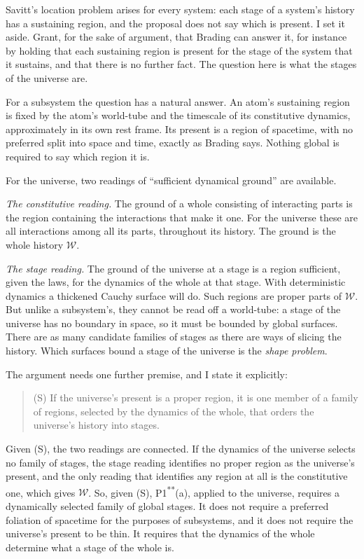 \documentclass[11pt]{article}
\newcommand{\W}{\mathcal W}
\begin{document}
Savitt's location problem arises for every system: each stage of a system's
history has a sustaining region, and the proposal does not say which is
present. I set it aside. Grant, for the sake of argument, that Brading can
answer it, for instance by holding that each sustaining region is present for
the stage of the system that it sustains, and that there is no further fact.
The question here is what the stages of the universe are.

For a subsystem the question has a natural answer. An atom's sustaining
region is fixed by the atom's world-tube and the timescale of its constitutive
dynamics, approximately in its own rest frame. Its present is a region of
spacetime, with no preferred split into space and time, exactly as Brading
says. Nothing global is required to say which region it is.

For the universe, two readings of ``sufficient dynamical ground'' are
available.

\emph{The constitutive reading.} The ground of a whole consisting of
interacting parts is the region containing the interactions that make it one.
For the universe these are all interactions among all its parts, throughout
its history. The ground is the whole history $\W$.

\emph{The stage reading.} The ground of the universe at a stage is a region
sufficient, given the laws, for the dynamics of the whole at that stage. With
deterministic dynamics a thickened Cauchy surface will do. Such regions are
proper parts of $\W$. But unlike a subsystem's, they cannot be read off a
world-tube: a stage of the universe has no boundary in space, so it must be
bounded by global surfaces. There are as many candidate families of stages as
there are ways of slicing the history. Which surfaces bound a stage of the
universe is the \emph{shape problem}.

The argument needs one further premise, and I state it explicitly:

\begin{quote}
(S) If the universe's present is a proper region, it is one member of a
family of regions, selected by the dynamics of the whole, that orders the
universe's history into stages.
\end{quote}

Given (S), the two readings are connected. If the dynamics of the universe
selects no family of stages, the stage reading identifies no proper region as
the universe's present, and the only reading that identifies any region at all
is the constitutive one, which gives $\W$. So, given (S),
P1\textsuperscript{**}(a), applied to the universe, requires a dynamically
selected family of global stages. It does not require a preferred foliation of
spacetime for the purposes of subsystems, and it does not require the universe's
present to be thin. It requires that the dynamics of the whole determine what a
stage of the whole is.
\end{document}
